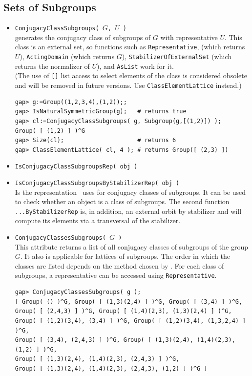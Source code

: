 \subsection{Sets of Subgroups}
\begin{itemize}
\item {\tt ConjugacyClassSubgroups( $G$, $U$ )}\\
generates the conjugacy class of subgroups of $G$ with representative $U$. This class
is an external set, so functions such as {\tt Representative}, (which returns $U$),
{\tt ActingDomain} (which returns $G$), {\tt StabilizerOfExternalSet} (which returns
the normalizer of $U$), and {\tt AsList} work for it. \\[4pt]
(The use of {\tt []} list access to select elements of the class is considered
obsolete and will be removed in future versions. Use {\tt ClassElementLattice} instead.)
{\codesize
\begin{verbatim}
gap> g:=Group((1,2,3,4),(1,2));;
gap> IsNaturalSymmetricGroup(g);   # returns true
gap> cl:=ConjugacyClassSubgroups( g, Subgroup(g,[(1,2)]) );
Group( [ (1,2) ] )^G
gap> Size(cl);                     # returns 6
gap> ClassElementLattice( cl, 4 ); # returns Group([ (2,3) ])
\end{verbatim}}

\item {\tt IsConjugacyClassSubgroupsRep( obj )}
\item {\tt IsConjugacyClassSubgroupsByStabilizerRep( obj )}\\
Is the representation \gap\ uses for conjugacy classes of subgroups. It can be used to check whether an
object is a class of subgroups. The second function {\tt ...ByStabilizerRep}
is, in addition, an external orbit by stabilizer and will compute its elements via a
transversal of the stabilizer. 

\item {\tt ConjugacyClassesSubgroups( $G$ )}\\
This attribute returns a list of all conjugacy classes of subgroups of the group
$G$. It also is applicable for lattices of subgroups. The order in which the classes
are listed depends on the method chosen by \gap. For each class of subgroups, a
representative can be accessed using {\tt Representative}.%
{\codesize
\begin{verbatim}
gap> ConjugacyClassesSubgroups( g );
[ Group( () )^G, Group( [ (1,3)(2,4) ] )^G, Group( [ (3,4) ] )^G,
Group( [ (2,4,3) ] )^G, Group( [ (1,4)(2,3), (1,3)(2,4) ] )^G,
Group( [ (1,2)(3,4), (3,4) ] )^G, Group( [ (1,2)(3,4), (1,3,2,4) ] )^G,
Group( [ (3,4), (2,4,3) ] )^G, Group( [ (1,3)(2,4), (1,4)(2,3), (1,2) ] )^G,
Group( [ (1,3)(2,4), (1,4)(2,3), (2,4,3) ] )^G,
Group( [ (1,3)(2,4), (1,4)(2,3), (2,4,3), (1,2) ] )^G ]
\end{verbatim}}


\end{itemize}
